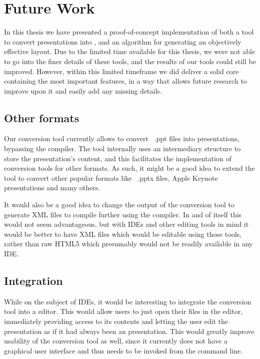   \section{Future Work}
   \label{future}

   In this thesis we have presented a proof-of-concept implementation of both a
   tool to convert \ppt presentations into \mxp, and an algorithm for
   generating an objectively effective layout. Due to the limited time
   available for this thesis, we were not able to go into the finer details of
   these tools, and the results of our tools could still be improved. However, within this
   limited timeframe we did deliver a solid core containing the most important
   features, in a way that allows future research to improve upon it and easily
   add any missing details.

   \subsection{Other formats}

    Our conversion tool currently allows to convert \ppt\ .ppt files into \mxp
    presentations, bypassing the \mxp compiler. The tool internally uses an
    intermediary structure to store the presentation's content, and this
    facilitates the implementation of conversion tools for other formats. As
    such, it might be a good idea to extend the tool to convert other popular
    formats like \ppt\ .pptx files, Apple Keynote presentations and many others.

    It would also be a good idea to change the output of the conversion tool to
    generate \mxp XML files to compile further using the \mxp compiler. In and
    of itself this would not seem advantageous, but with \mxp IDEs and other
    editing tools in mind it would be better to have XML files which would be
    editable using those tools, rather than raw HTML5 which presumably would
    not be readily available in any IDE.

   \subsection{Integration}

    While on the subject of IDEs, it would be interesting to integrate the conversion
    tool into a \mxp editor. This would allow \mxp users to just open their
    \ppt files in the \mxp editor, immediately providing access to its contents
    and letting the user edit the presentation as if it had always been an \mxp
    presentation. This would greatly improve usability of the conversion tool
    as well, since it currently does not have a graphical user interface and
    thus needs to be invoked from the command line.

